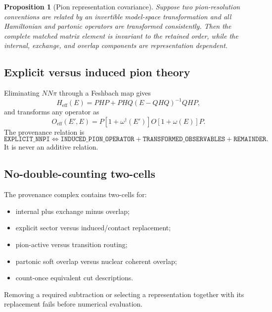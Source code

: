 \documentclass[11pt]{article}
\newtheorem{proposition}[definition]{Proposition}
\newcommand{\eff}{\mathrm{eff}}
\begin{document}
\begin{proposition}[Pion representation covariance]
Suppose two pion-resolution conventions are related by an invertible
model-space transformation and all Hamiltonian and partonic operators are
transformed consistently.  Then the complete matched matrix element is
invariant to the retained order, while the internal, exchange, and overlap
components are representation dependent.
\end{proposition}

\subsection{Explicit versus induced pion theory}

Eliminating \(NN\pi\) through a Feshbach map gives
\begin{equation}
 H_{\eff}(E)
 =PHP+PHQ(E-QHQ)^{-1}QHP,
 \label{eq:n1-feshbach-h}
\end{equation}
and transforms any operator as
\begin{equation}
 O_{\eff}(E',E)
 =P[1+\omega^{\dagger}(E')]O[1+\omega(E)]P.
 \label{eq:n1-feshbach-o}
\end{equation}
The provenance relation is
\begin{equation}
 \texttt{EXPLICIT\_NNPI}
 \Longleftrightarrow
 \texttt{INDUCED\_PION\_OPERATOR}
 +\texttt{TRANSFORMED\_OBSERVABLES}
 +\texttt{REMAINDER}.
 \label{eq:pion-provenance-equivalence}
\end{equation}
It is never an additive relation.

\subsection{No-double-counting two-cells}

The provenance complex contains two-cells for:
\begin{itemize}
\item internal plus exchange minus overlap;
\item explicit sector versus induced/contact replacement;
\item pion-active versus transition routing;
\item partonic soft overlap versus nuclear coherent overlap;
\item count-once equivalent cut descriptions.
\end{itemize}
Removing a required subtraction or selecting a representation together with
its replacement fails before numerical evaluation.
\end{document}
